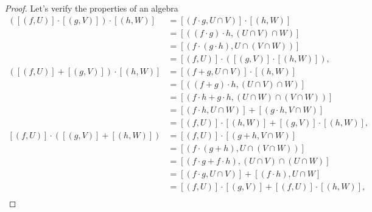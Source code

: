 \begin{proof}
	Let's verify the properties of an algebra
	\begingroup
	\allowdisplaybreaks%
	\begin{align*}
		\left([(f, U)] \cdot [(g, V)]\right) \cdot [(h, W)] & = [(f \cdot g, U \cap V)]\cdot [(h, W)]                                       \\
		                                                    & = [((f \cdot g)\cdot h, (U \cap V) \cap W)]                                   \\
		                                                    & = [(f \cdot (g \cdot h), U \cap (V \cap W))]                                  \\
		                                                    & = [(f, U)]\cdot \left([(g, V)]\cdot [(h, W)]\right),                          \\
		([(f, U)] + [(g, V)])\cdot [(h, W)]                 & = [(f + g, U\cap V)]\cdot [(h, W)]                                            \\
		                                                    & = [((f + g)\cdot h, (U\cap V) \cap W)]                                        \\
		                                                    & = [(f\cdot h + g\cdot h, (U\cap W) \cap (V\cap W))]                           \\
		                                                    & = [(f\cdot h, U\cap W)] + [(g\cdot h, V\cap W)]                               \\
		                                                    & = [(f, U)]\cdot [(h, W)] + [(g, V)]\cdot [(h, W)],                            \\
		[(f, U)]\cdot ([(g, V)] + [(h, W)])                 & = [(f, U)]\cdot [(g + h, V\cap W)]                                            \\
		                                                    & = [(f\cdot (g + h), U\cap (V\cap W))]                                         \\
		                                                    & = [(f\cdot g + f\cdot h), (U\cap V) \cap (U\cap W)]                           \\
		                                                    & = [(f\cdot g, U\cap V)] + [(f\cdot h), U\cap W]                               \\
		                                                    & = [(f, U)]\cdot [(g, V)] + [(f, U)]\cdot [(h, W)],                            \\

\end{align*}
\end{proof}
